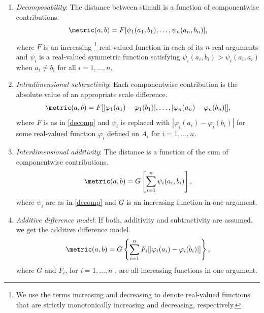 \begin{defi}
\leavevmode \vspace{-\baselineskip}
  \begin{enumerate}
  \item \emph{Decomposability}: The distance between stimuli is a function of componentwise contributions.\\
    \begin{equation}\label{decomp}
    \metric(a,b) = F[\psi_1(a_1, b_1), \ldots , \psi_n(a_n, b_n)],
    \end{equation}
    where $F$ is an increasing \footnote{We use the terms increasing and decreasing to denote real-valued functions that are strictly monotonically increasing and decreasing, respectively.} real-valued function in each of its $n$ real arguments and $\psi_i$ is a real-valued symmetric function satisfying $\psi_i(a_i, b_i) > \psi_i(a_i, a_i)$ when $a_i \neq b_i$ for all $i = 1, ..., n$.
  \item \emph{Intradimensional subtractivity}: Each componentwise contribution is the absolute value of an appropriate scale difference.\\
    \begin{equation}\label{subtr}
    \metric(a,b) = F[ |\varphi_1(a_1) - \varphi_1(b_1)| , \ldots , | \varphi_n(a_n) - \varphi_n(b_n)| ],
  \end{equation}
  where $F$ is as in \cref{decomp} and $\psi_i$ is replaced with $|\varphi_i(a_i) - \varphi_i(b_i)|$ for some real-valued function $\varphi_i$ defined on $A_i$ for $i = 1, ..., n$.
  \item \emph{Interdimensional additivity}: The distance is a function of the sum of componentwise contributions.
    \begin{equation}\label{iterdim-add}
    \metric(a,b) = G \left [ \sum_{i=1}^{n} \psi_i(a_i, b_i) \right],
  \end{equation}
  where $\psi_i$ are as in \cref{decomp} and $G$ is an increasing function in one argument.
\item \emph{Additive difference model}: If both, additivity and subtractivity are assumed, we get the additive difference model.
    \begin{equation}\label{add-diff-model}
    \metric(a,b) = G \left \{ \sum_{i=1}^{n} F_i[ | \varphi_i(a_i) - \varphi_i(b_i)| ] \right \},
    \end{equation}
    where $G$ and $F_i$, for $i=1, \ldots ,n$ , are all increasing functions in one argument.
  \end{enumerate}
\end{defi}
